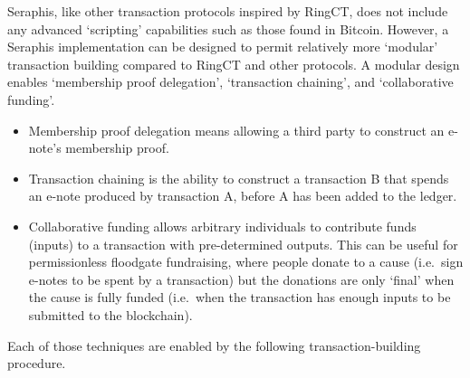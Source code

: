 Seraphis, like other transaction protocols inspired by RingCT, does not include any advanced `scripting' capabilities such as those found in Bitcoin. However, a Seraphis implementation can be designed to permit relatively more `modular' transaction building compared to RingCT and other protocols. A modular design enables `membership proof delegation', `transaction chaining', and `collaborative funding'.

\begin{itemize}
    \item Membership proof delegation means allowing a third party to construct an e-note's membership proof.

    \item Transaction chaining is the ability to construct a transaction B that spends an e-note produced by transaction A, before A has been added to the ledger.

    \item Collaborative funding allows arbitrary individuals to contribute funds (inputs) to a transaction with pre-determined outputs. This can be useful for permissionless floodgate fundraising, where people donate to a cause (i.e.\ sign e-notes to be spent by a transaction) but the donations are only `final' when the cause is fully funded (i.e.\ when the transaction has enough inputs to be submitted to the blockchain).
\end{itemize}

Each of those techniques are enabled by the following transaction-building procedure.

